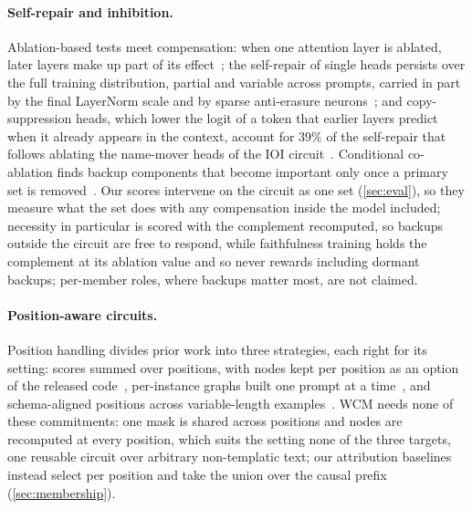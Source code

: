 \documentclass[10pt]{article}
\begin{document}
\paragraph{Self-repair and inhibition.}
Ablation-based tests meet compensation: when one attention layer is ablated, later layers make up part of its effect~\citep{mcgrath2023hydra}; the self-repair of single heads persists over the full training distribution, partial and variable across prompts, carried in part by the final LayerNorm scale and by sparse anti-erasure neurons~\citep{rushing2024explorations}; and copy-suppression heads, which lower the logit of a token that earlier layers predict when it already appears in the context, account for $39\%$ of the self-repair that follows ablating the name-mover heads of the IOI circuit~\citep{mcdougall2024copy}.
Conditional co-ablation finds backup components that become important only once a primary set is removed~\citep{gong2026conditional}.
Our scores intervene on the circuit as one set (\cref{sec:eval}), so they measure what the set does with any compensation inside the model included; necessity in particular is scored with the complement recomputed, so backups outside the circuit are free to respond, while faithfulness training holds the complement at its ablation value and so never rewards including dormant backups; per-member roles, where backups matter most, are not claimed.

\paragraph{Position-aware circuits.}
Position handling divides prior work into three strategies, each right for its setting: scores summed over positions, with nodes kept per position as an option of the released code~\citep{marks2025sparse}, per-instance graphs built one prompt at a time~\citep{ameisen2025circuit}, and schema-aligned positions across variable-length examples~\citep{haklay2025position}.
WCM needs none of these commitments: one mask is shared across positions and nodes are recomputed at every position, which suits the setting none of the three targets, one reusable circuit over arbitrary non-templatic text; our attribution baselines instead select per position and take the union over the causal prefix (\cref{sec:membership}).
\end{document}
